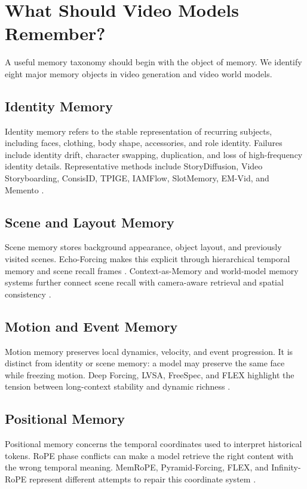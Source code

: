 \section{What Should Video Models Remember?}

A useful memory taxonomy should begin with the object of memory. We identify eight major memory objects in video generation and video world models.



\subsection{Identity Memory}
Identity memory refers to the stable representation of recurring subjects, including faces, clothing, body shape, accessories, and role identity. Failures include identity drift, character swapping, duplication, and loss of high-frequency identity details. Representative methods include StoryDiffusion, Video Storyboarding, ConsisID, TPIGE, IAMFlow, SlotMemory, EM-Vid, and Memento \citep{storydiffusion2024,videostoryboarding2024,consisid2024,tpige2025,iamflow2026,slotmemory2026,emvid2026,memento2026}.

\subsection{Scene and Layout Memory}
Scene memory stores background appearance, object layout, and previously visited scenes. Echo-Forcing makes this explicit through hierarchical temporal memory and scene recall frames \citep{echoforcing2026}. Context-as-Memory and world-model memory systems further connect scene recall with camera-aware retrieval and spatial consistency \citep{contextmemory2025,worldmem2025}.

\subsection{Motion and Event Memory}
Motion memory preserves local dynamics, velocity, and event progression. It is distinct from identity or scene memory: a model may preserve the same face while freezing motion. Deep Forcing, LVSA, FreeSpec, and FLEX highlight the tension between long-context stability and dynamic richness \citep{deepforcing2025,lvsa2026,freespec2026,flex2026}.

\subsection{Positional Memory}
Positional memory concerns the temporal coordinates used to interpret historical tokens. RoPE phase conflicts can make a model retrieve the right content with the wrong temporal meaning. MemRoPE, Pyramid-Forcing, FLEX, and Infinity-RoPE represent different attempts to repair this coordinate system \citep{memrope2026,pyramidforcing2026,flex2026,infinityrope2025}.

